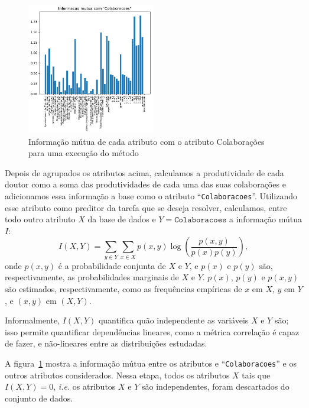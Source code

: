 \documentclass[12pt]{article}
\begin{document}
\begin{figure}
  \centering
  \includegraphics[width=0.5\textwidth]{graphs/mutual_information.pdf}
  \vspace{-15pt}
  \caption{Informação mútua de cada atributo com o atributo Colaborações para uma execução do método}
  \label{fig:mutual-info}
\end{figure}

Depois de agrupados os atributos acima, calculamos a produtividade de cada doutor como a soma das produtividades de cada uma das suas colaborações e adicionamos essa informação a base como o atributo ``\texttt{Colaboracoes}''.
Utilizando esse atributo como preditor da tarefa que se deseja resolver, calculamos, entre todo outro atributo $X$ da base de dados e $Y = \texttt{Colaboracoes}$ a informação mútua $I$:
\begin{equation}
  I(X, Y) = \sum_{y \in Y} \sum_{x \in X} p(x, y) \log \left( \frac{p(x, y)}{p(x)p(y)} \right),
\end{equation}
onde $p(x, y)$ é a probabilidade conjunta de $X$ e $Y$, e $p(x)$ e $p(y)$ são, respectivamente, as probabilidades marginais de $X$ e $Y$.
$p(x)$, $p(y)$ e $p(x, y)$ são estimados, respectivamente, como as frequências empíricas de $x$ em $X$, $y$ em $Y$, e $(x, y)$ em $(X, Y)$.

Informalmente, $I(X, Y)$ quantifica quão independente as variáveis $X$ e $Y$ são; isso permite quantificar dependências lineares, como a métrica correlação é capaz de fazer, e não-lineares entre as distribuições estudadas.

A figura~\ref{fig:mutual-info} mostra a informação mútua entre os atributos e ``\texttt{Colaboracoes}'' e os outros atributos considerados.
Nessa etapa, todos os atributos $X$ tais que $I(X, Y) = 0$, \emph{i.e.} os atributos $X$ e $Y$ são independentes, foram descartados do conjunto de dados.
\end{document}
